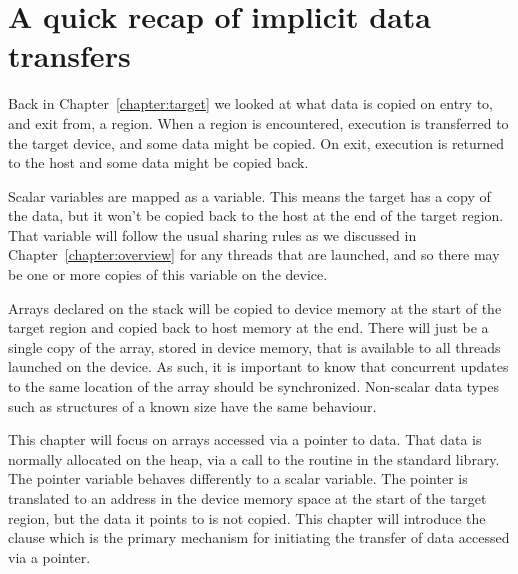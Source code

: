 \section{A quick recap of implicit data transfers}

Back in Chapter~\ref{chapter:target} we looked at what data is copied on entry to, and exit from, a  region.
When a  region is encountered, execution is transferred to the target device, and some data might be copied.
On exit, execution is returned to the host and some data might be copied back.

Scalar variables are mapped as a  variable. This means the target has a copy of the data, but it won't be copied back to the host at the end of the target region. That variable will follow the usual sharing rules as we discussed in Chapter~\ref{chapter:overview} for any threads that are launched, and so there may be one or more copies of this variable on the device.


Arrays declared on the stack will be copied to device memory at the start of the target region and copied back to host memory at the end. There will just be a single copy of the array, stored in device memory, that is available to all threads launched on the device. As such, it is important to know that concurrent updates to the same location of the array should be synchronized.
Non-scalar data types such as structures of a known size have the same behaviour.

This chapter will focus on arrays accessed via a pointer to data. That data is normally allocated on the heap, via a call to the  routine in the standard library. The pointer variable behaves differently to a scalar variable. The pointer is translated to an address in the device memory space at the start of the target region, but the data it points to is not copied.
This chapter will introduce the  clause which is the primary mechanism for initiating the transfer of data accessed via a pointer.



